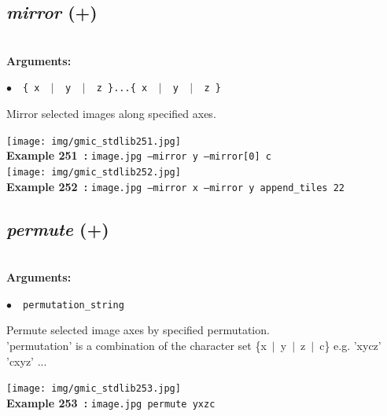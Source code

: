 \documentclass[a4paper,10.5pt,twoside]{book}
\def\comma{\discretionary{,}{}{,}}
\newcommand{\Cb}[1]{\textcolor{cb}{#1}}
\begin{document}
\subsection{\emph{mirror} (+)}\vspace*{-0.7em}
~\\\textbf{\Cb{Arguments: }}\begin{flushleft}
{\small \Cb{\hspace*{0.5cm}$\bullet$~~\texttt{\{ x ~$|$~ y ~$|$~ z \}...\{ x ~$|$~ y ~$|$~ z \}}}}\end{flushleft}
Mirror selected images along specified axes.
\begin{center}\texttt{[image: img/gmic\_stdlib251.jpg]}\\
{\footnotesize \textbf{Example 251~:} \texttt{image.jpg --mirror y --mirror[0] c}}
\\\texttt{[image: img/gmic\_stdlib252.jpg]}\\
{\footnotesize \textbf{Example 252~:} \texttt{image.jpg --mirror x --mirror y append\_tiles 2{\comma}2}}
\end{center}

\subsection{\emph{permute} (+)}\vspace*{-0.7em}
~\\\textbf{\Cb{Arguments: }}\begin{flushleft}
{\small \Cb{\hspace*{0.5cm}$\bullet$~~\texttt{permutation\_string}}}\end{flushleft}
Permute selected image axes by specified permutation.
~\\'permutation' is a combination of the character set \{x~$|$~y~$|$~z~$|$~c\}{\comma}
e.g. 'xycz'{\comma} 'cxyz'{\comma} ...
\begin{center}\texttt{[image: img/gmic\_stdlib253.jpg]}\\
{\footnotesize \textbf{Example 253~:} \texttt{image.jpg permute yxzc}}
\end{center}
\end{document}
